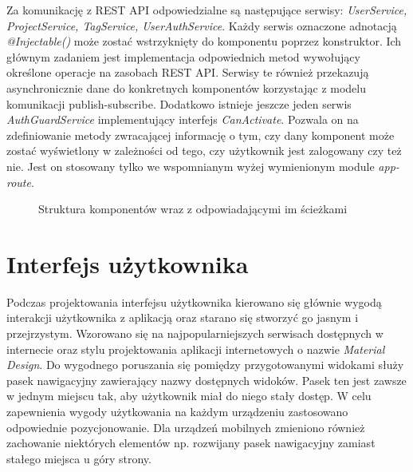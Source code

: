 Za komunikację z REST API odpowiedzialne są następujące serwisy: \textit{UserService, ProjectService, TagService, UserAuthService}. Każdy serwis oznaczone adnotacją \textit{@Injectable()} może zostać wstrzyknięty do komponentu poprzez konstruktor. Ich głównym zadaniem jest implementacja odpowiednich metod wywołujący określone operacje na zasobach REST API. Serwisy te również przekazują asynchronicznie dane do konkretnych komponentów korzystając z modelu komunikacji publish-subscribe\cite{DPT01}. Dodatkowo istnieje jeszcze jeden serwis \textit{AuthGuardService} implementujący interfejs \textit{CanActivate}. Pozwala on na zdefiniowanie metody zwracającej informację o tym, czy dany komponent może zostać wyświetlony w zależności od tego, czy użytkownik jest zalogowany czy też nie. Jest on stosowany tylko we wspomnianym wyżej wymienionym module \textit{app-route}.

\begin{figure}[h!]
	\caption{Struktura komponentów wraz z odpowiadającymi im ścieżkami}
	\centering
\end{figure}


\section{Interfejs użytkownika}

Podczas projektowania interfejsu użytkownika kierowano się głównie wygodą interakcji użytkownika z aplikacją oraz starano się stworzyć go jasnym i przejrzystym. Wzorowano się na najpopularniejszych serwisach dostępnych w internecie oraz stylu projektowania aplikacji internetowych o nazwie \textit{Material Design}. Do wygodnego poruszania się pomiędzy przygotowanymi widokami służy pasek nawigacyjny zawierający nazwy dostępnych widoków. Pasek ten jest zawsze w jednym miejscu tak, aby użytkownik miał do niego stały dostęp. W celu zapewnienia wygody użytkowania na każdym urządzeniu zastosowano odpowiednie pozycjonowanie. Dla urządzeń mobilnych zmieniono również zachowanie niektórych elementów np. rozwijany pasek nawigacyjny zamiast stałego miejsca u góry strony. 

